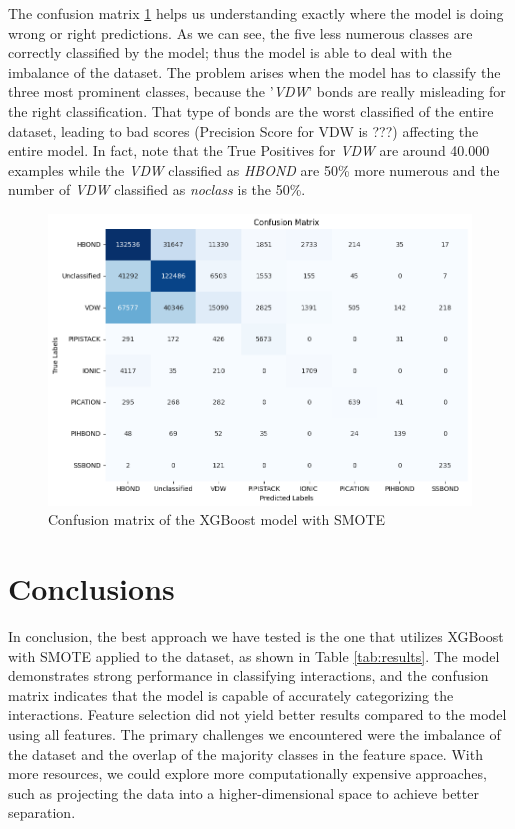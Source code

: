 \documentclass[10pt,twocolumn,letterpaper]{article}
\begin{document}
The confusion matrix \ref{fig:cmXGBoostSMOTE} helps us understanding exactly where the model is doing wrong or right predictions. As we can see, the five less numerous classes are correctly classified by the model; thus the model is able to deal with the imbalance of the dataset. The problem arises when the model has to classify the three most prominent classes, because the '\textit{VDW}' bonds are really misleading for the right classification. That type of bonds are the worst classified of the entire dataset, leading to bad scores (Precision Score for VDW is ???) affecting the entire model. In fact, note that the True Positives for \textit{VDW} are around 40.000 examples while the \textit{VDW} classified as \textit{HBOND} are 50\% more numerous and the number of \textit{VDW} classified as \textit{noclass} is the 50\%.
\begin{center}
    \begin{figure}[h!]
        \centering
        \includegraphics[scale=0.25]{img/cmXGBoostSMOTE.png}
        \caption{Confusion matrix of the XGBoost model with SMOTE}
        \label{fig:cmXGBoostSMOTE}
    \end{figure}
\end{center}

\section{Conclusions}
In conclusion, the best approach we have tested is the one that utilizes XGBoost with SMOTE applied to the dataset, as shown in Table \ref{tab:results}. 
The model demonstrates strong performance in classifying interactions, and the confusion matrix indicates that the model is capable of accurately categorizing the interactions. 
Feature selection did not yield better results compared to the model using all features. 
The primary challenges we encountered were the imbalance of the dataset and the overlap of the majority classes in the feature space. 
With more resources, we could explore more computationally expensive approaches, such as projecting the data into a higher-dimensional space to achieve better separation.


{\small


}
\end{document}

